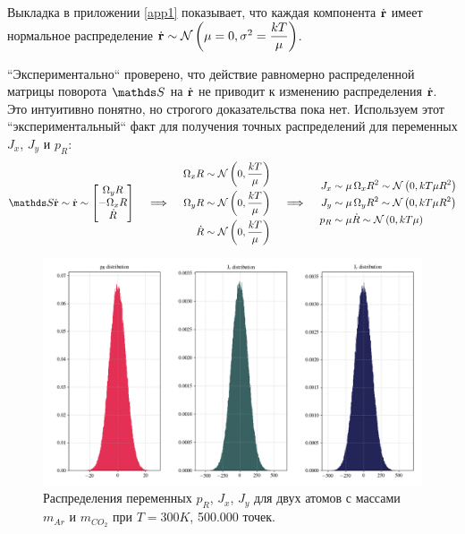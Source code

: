 Выкладка в приложении \ref{app1} показывает, что каждая компонента $\dot{\mathbf{r}}$ имеет нормальное распределение $\dot{\mathbf{r}} \sim \mathcal{N} \left( \mu = 0, \sigma^2 = \displaystyle \frac{kT}{\mu} \right)$. \par
``Экспериментально``  проверено, что действие равномерно распределенной матрицы поворота $\bbS$ на $\dot{\mathbf{r}}$ не приводит к изменению распределения $\dot{\mathbf{r}}$. Это интуитивно понятно, но строгого доказательства пока нет. Используем этот ``экспериментальный``  факт для получения точных распределений для переменных $J_x$, $J_y$ и $p_R$:
\begin{gather}
	\bbS \dot{\mf{r}} \sim \dot{\mf{r}} \sim
	\begin{bmatrix}
		\Omega_y R \\
		- \Omega_x R \\
		\dot{R}
	\end{bmatrix}
	\quad \implies \quad
	\begin{aligned}
			\Omega_x R &\sim \mN \lb 0, \frac{k T}{\mu} \rb \\
			\Omega_y R &\sim \mN \lb 0, \frac{k T}{\mu} \rb \\
			\dot{R} &\sim \mN \lb 0, \frac{k T}{\mu} \rb 
	\end{aligned} \quad \implies \quad  
	\begin{aligned}
			J_x &\sim \mu \, \Omega_x R^2 \sim \mN \lb 0, k T \mu R^2 \rb \\
			J_y &\sim \mu \, \Omega_y R^2 \sim \mN \lb 0, k T \mu R^2 \rb \\
			p_R &\sim \mu \dot{R} \sim \mN \lb 0, k T \mu \rb  
	\end{aligned} \notag 
\end{gather}

\begin{figure}[ht!]
		\includegraphics[width=\textwidth]{../pictures/diatomicsDistributions.png}
		\caption{Распределения переменных $p_R$, $J_x$, $J_y$ для двух атомов с массами $m_{Ar}$ и $m_{CO_2}$ при $T = 300 K$, 500.000 точек.}
\end{figure}

